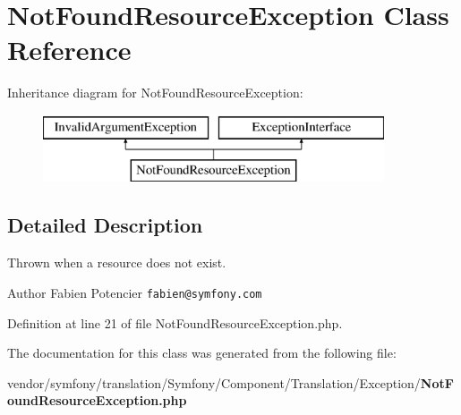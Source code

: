 \section{Not\+Found\+Resource\+Exception Class Reference}
\label{class_symfony_1_1_component_1_1_translation_1_1_exception_1_1_not_found_resource_exception}
Inheritance diagram for Not\+Found\+Resource\+Exception\+:\begin{figure}[H]
\begin{center}
\leavevmode
\includegraphics[height=2.000000cm]{class_symfony_1_1_component_1_1_translation_1_1_exception_1_1_not_found_resource_exception}
\end{center}
\end{figure}


\subsection{Detailed Description}
Thrown when a resource does not exist.

\begin{DoxyAuthor}{Author}
Fabien Potencier {\tt fabien@symfony.\+com}
\end{DoxyAuthor}


Definition at line 21 of file Not\+Found\+Resource\+Exception.\+php.



The documentation for this class was generated from the following file\+:\begin{DoxyCompactItemize}
\item 
vendor/symfony/translation/\+Symfony/\+Component/\+Translation/\+Exception/{\bf Not\+Found\+Resource\+Exception.\+php}\end{DoxyCompactItemize}

